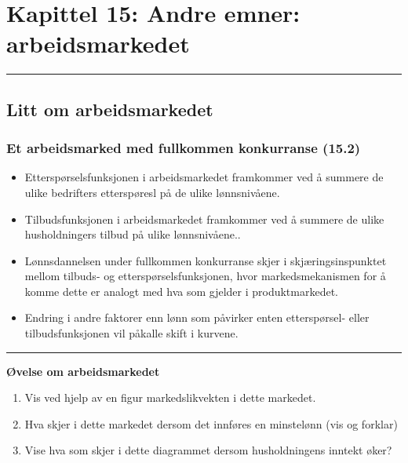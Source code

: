 \documentclass[
  letterpaper,
  DIV=11,
  numbers=noendperiod]{scrartcl}
\providecommand{\tightlist}{%
  \setlength{\itemsep}{0pt}\setlength{\parskip}{0pt}}\usepackage{longtable,booktabs,array}
\begin{document}
\section{Kapittel 15: Andre emner:
arbeidsmarkedet}\label{kapittel-15-andre-emner-arbeidsmarkedet}

\begin{center}\rule{0.5\linewidth}{0.5pt}\end{center}

\subsection{Litt om arbeidsmarkedet}\label{litt-om-arbeidsmarkedet}

\subsubsection{Et arbeidsmarked med fullkommen konkurranse
(15.2)}\label{et-arbeidsmarked-med-fullkommen-konkurranse-15.2}

\begin{itemize}
\tightlist
\item
  Etterspørselsfunksjonen i arbeidsmarkedet framkommer ved å summere de
  ulike bedrifters etterspøresl på de ulike lønnsnivåene.
\item
  Tilbudsfunksjonen i arbeidsmarkedet framkommer ved å summere de ulike
  husholdningers tilbud på ulike lønnsnivåene..
\item
  Lønnsdannelsen under fullkommen konkurranse skjer i
  skjæringsinspunktet mellom tilbuds- og etterspørselsfunksjonen, hvor
  markedsmekanismen for å komme dette er analogt med hva som gjelder i
  produktmarkedet.\\
\item
  Endring i andre faktorer enn lønn som påvirker enten etterspørsel-
  eller tilbudsfunksjonen vil påkalle skift i kurvene.
\end{itemize}

\begin{center}\rule{0.5\linewidth}{0.5pt}\end{center}

\textbf{Øvelse om arbeidsmarkedet}

\begin{enumerate}
\def\labelenumi{\arabic{enumi}.}
\tightlist
\item
  Vis ved hjelp av en figur markedslikvekten i dette markedet.
\item
  Hva skjer i dette markedet dersom det innføres en minstelønn (vis og
  forklar)
\item
  Vise hva som skjer i dette diagrammet dersom husholdningens inntekt
  øker?
\end{enumerate}
\end{document}
